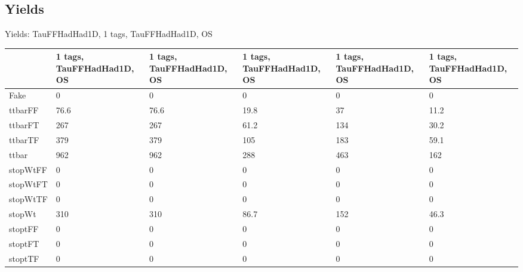 
\subsection{Yields}

\begin{frame}{Yields: TauFFHadHad1D, 1 tags, TauFFHadHad1D, OS}
\begin{center}
  \begin{tabular}{l| >{\centering\let\newline\\\arraybackslash\hspace{0pt}}m{1.4cm}| >{\centering\let\newline\\\arraybackslash\hspace{0pt}}m{1.4cm}| >{\centering\let\newline\\\arraybackslash\hspace{0pt}}m{1.4cm}| >{\centering\let\newline\\\arraybackslash\hspace{0pt}}m{1.4cm}| >{\centering\let\newline\\\arraybackslash\hspace{0pt}}m{1.4cm}}
    & 1 tags, TauFFHadHad1D, OS & 1 tags, TauFFHadHad1D, OS & 1 tags, TauFFHadHad1D, OS & 1 tags, TauFFHadHad1D, OS & 1 tags, TauFFHadHad1D, OS \\
 \hline \hline
    Fake& 0 & 0 & 0 & 0 & 0 \\
 \hline
    ttbarFF& 76.6 & 76.6 & 19.8 & 37 & 11.2 \\
 \hline
    ttbarFT& 267 & 267 & 61.2 & 134 & 30.2 \\
 \hline
    ttbarTF& 379 & 379 & 105 & 183 & 59.1 \\
 \hline
    ttbar& 962 & 962 & 288 & 463 & 162 \\
 \hline
    stopWtFF& 0 & 0 & 0 & 0 & 0 \\
 \hline
    stopWtFT& 0 & 0 & 0 & 0 & 0 \\
 \hline
    stopWtTF& 0 & 0 & 0 & 0 & 0 \\
 \hline
    stopWt& 310 & 310 & 86.7 & 152 & 46.3 \\
 \hline
    stoptFF& 0 & 0 & 0 & 0 & 0 \\
 \hline
    stoptFT& 0 & 0 & 0 & 0 & 0 \\
 \hline
    stoptTF& 0 & 0 & 0 & 0 & 0 \\
 \hline

\end{tabular}
\end{center}
\end{frame}
